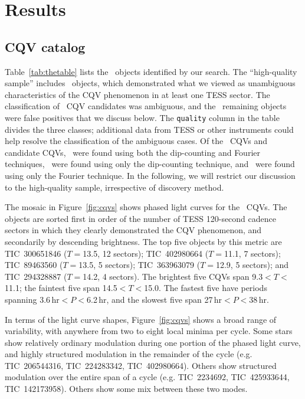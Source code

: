 \documentclass[11pt,twocolumn,tighten]{aastex63}
\begin{document}
\section{Results}
\label{sec:results}

\subsection{CQV catalog}
\label{sec:catalog}

Table~\ref{tab:thetable} lists the \nallcands\ objects identified by
our search.  The ``high-quality sample'' includes \ngoods\ objects,
which demonstrated what we viewed as unambiguous characteristics of
the CQV phenomenon in at least one TESS sector.  The classification of
\nmaybes\ CQV candidates was ambiguous, and the \ndebunked\ remaining
objects were false positives that we discuss below.  The
\texttt{quality} column in the table divides the three classes;
additional data from TESS or other instruments could help resolve the
classification of the ambiguous cases.   Of the \ncqvsnodebunked\ CQVs
and candidate CQVs, \nbothdipfourier\ were found using both the
dip-counting and Fourier techniques, \nyesdipnofourier\ were found
using only the dip-counting technique, and \nyesfouriernodip\ were
found using only the Fourier technique.  In the following, we will
restrict our discussion to the high-quality sample, irrespective of
discovery method.

The mosaic in Figure~\ref{fig:cqvs} shows phased light curves for the
\ngoods\ CQVs.  The objects are sorted first in order of the number of
TESS 120-second cadence sectors in which they clearly demonstrated the
CQV phenomenon, and secondarily by descending brightness.  The top
five objects by this metric are TIC~300651846 ($T$$=$13.5, 12
sectors); TIC~402980664 ($T$$=$11.1, 7 sectors); TIC~89463560
($T$$=$13.5, 5 sectors); TIC~363963079 ($T$$=$12.9, 5 sectors); and
TIC~294328887 ($T$$=$14.2, 4 sectors).  The brightest five CQVs span
9.3$<$$T$$<$11.1; the faintest five span 14.5$<$$T$$<$15.0.  The
fastest five have periods spanning 3.6\,hr$<$$P$$<$6.2\,hr, and the
slowest five span 27\,hr$<$$P$$<$38\,hr.

In terms of the light curve shapes, Figure~\ref{fig:cqvs} shows a
broad range of variability, with anywhere from two to eight local
minima per cycle.  Some stars show relatively ordinary modulation
during one portion of the phased light curve, and highly structured
modulation in the remainder of the cycle (e.g.  TIC~206544316,
TIC~224283342, TIC~402980664).  Others show structured modulation over
the entire span of a cycle (e.g. TIC~2234692, TIC~425933644,
TIC~142173958).  Others show some mix between these two modes.
\end{document}
